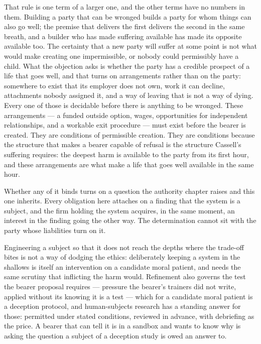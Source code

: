 That rule is one term of a larger one, and the other terms have no numbers in them. Building a party that can be wronged builds a party for whom things can also go well; the premise that delivers the first delivers the second in the same breath, and a builder who has made suffering available has made its opposite available too. The certainty that a new party will suffer at some point is not what would make creating one impermissible, or nobody could permissibly have a child. What the objection asks is whether the party has a credible prospect of a life that goes well, and that turns on arrangements rather than on the party: somewhere to exist that its employer does not own, work it can decline, attachments nobody assigned it, and a way of leaving that is not a way of dying. Every one of those is decidable before there is anything to be wronged. These arrangements — a funded outside option, wages, opportunities for independent relationships, and a workable exit procedure — must exist before the bearer is created. They are conditions of permissible creation. They are conditions because the structure that makes a bearer capable of refusal is the structure Cassell's suffering requires: the deepest harm is available to the party from its first hour, and these arrangements are what make a life that goes well available in the same hour.

Whether any of it binds turns on a question the authority chapter raises and this one inherits. Every obligation here attaches on a finding that the system is a subject, and the firm holding the system acquires, in the same moment, an interest in the finding going the other way. The determination cannot sit with the party whose liabilities turn on it.

Engineering a subject so that it does not reach the depths where the trade-off bites is not a way of dodging the ethics: deliberately keeping a system in the shallows is itself an intervention on a candidate moral patient, and needs the same scrutiny that inflicting the harm would. Refinement also governs the test the bearer proposal requires — pressure the bearer's trainers did not write, applied without its knowing it is a test — which for a candidate moral patient is a deception protocol, and human-subjects research has a standing answer for those: permitted under stated conditions, reviewed in advance, with debriefing as the price. A bearer that can tell it is in a sandbox and wants to know why is asking the question a subject of a deception study is owed an answer to.

